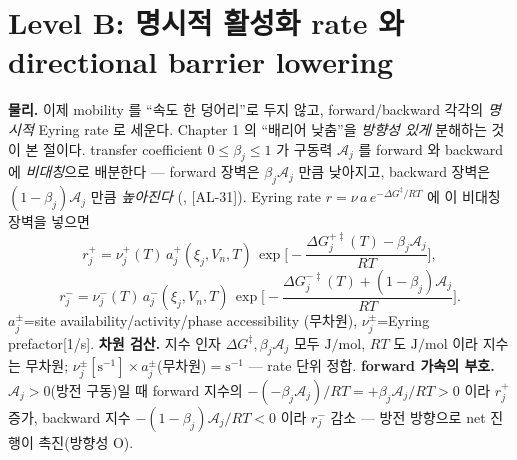 \documentclass[11pt,a4paper]{article}
\newcommand{\AL}[1]{\textsf{[AL-#1]}}
\begin{document}
\section{Level B: 명시적 활성화 rate 와 directional barrier lowering}\label{sec:ch3_levelB}
\textbf{물리.} 이제 mobility 를 ``속도 한 덩어리''로 두지 않고, forward/backward 각각의 \emph{명시적} Eyring
rate 로 세운다. Chapter 1 의 ``배리어 낮춤''을 \emph{방향성 있게} 분해하는 것이 본 절이다. transfer coefficient
$0\le\beta_j\le1$ 가 구동력 $\mathcal A_j$ 를 forward 와 backward 에 \emph{비대칭}으로 배분한다 — forward 장벽은
$\beta_j\mathcal A_j$ 만큼 낮아지고, backward 장벽은 $(1-\beta_j)\mathcal A_j$ 만큼 \emph{높아진다}
(\cite{evanspolanyi1938,bardfaulkner,bazant2013}, \AL{31}). Eyring rate $r=\nu\,a\,e^{-\Delta G^\ddagger/RT}$ 에
이 비대칭 장벽을 넣으면
\begin{equation}
r_j^+=\nu_j^+(T)\,a_j^+(\xi_j,V_n,T)\,\exp\!\Big[-\frac{\Delta G_j^{+\ddagger}(T)-\beta_j\mathcal A_j}{RT}\Big],
\label{eq:ch3_rplus}
\end{equation}
\begin{equation}
r_j^-=\nu_j^-(T)\,a_j^-(\xi_j,V_n,T)\,\exp\!\Big[-\frac{\Delta G_j^{-\ddagger}(T)+(1-\beta_j)\mathcal A_j}{RT}\Big].
\label{eq:ch3_rminus}
\end{equation}
$a_j^\pm$=site availability/activity/phase accessibility (무차원), $\nu_j^\pm$=Eyring prefactor[1/s].
\textbf{차원 검산.} 지수 인자 $\Delta G^\ddagger,\beta_j\mathcal A_j$ 모두 $\mathrm{J/mol}$, $RT$ 도
$\mathrm{J/mol}$ 이라 지수는 무차원; $\nu_j^\pm[\mathrm{s^{-1}}]\times a_j^\pm$(무차원)$=\mathrm{s^{-1}}$ — rate
단위 정합. \textbf{forward 가속의 부호.} $\mathcal A_j>0$(방전 구동)일 때 forward 지수의 $-(-\beta_j\mathcal A_j)/RT
=+\beta_j\mathcal A_j/RT>0$ 이라 $r_j^+$ 증가, backward 지수 $-(1-\beta_j)\mathcal A_j/RT<0$ 이라 $r_j^-$ 감소 —
방전 방향으로 net 진행이 촉진(방향성 O).
\end{document}
